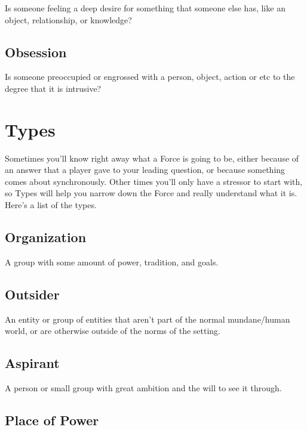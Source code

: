 \documentclass[10pt,twoside,openright]{memoir}
\begin{document}
Is someone feeling a deep desire for something that someone else has,
like an object, relationship, or knowledge?

\hypertarget{obsession}{%
\subsection{Obsession}\label{obsession}}

Is someone preoccupied or engrossed with a person, object, action or etc
to the degree that it is intrusive?

\hypertarget{types}{%
\section{Types}\label{types}}

Sometimes you'll know right away what a Force is going to be, either
because of an answer that a player gave to your leading question, or
because something comes about synchronously. Other times you'll only
have a stressor to start with, so Types will help you narrow down the
Force and really understand what it is. Here's a list of the types.

\hypertarget{organization}{%
\subsection{Organization}\label{organization}}

A group with some amount of power, tradition, and goals.

\hypertarget{outsider}{%
\subsection{Outsider}\label{outsider}}

An entity or group of entities that aren't part of the normal
mundane/human world, or are otherwise outside of the norms of the
setting.

\hypertarget{aspirant}{%
\subsection{Aspirant}\label{aspirant}}

A person or small group with great ambition and the will to see it
through.

\hypertarget{place-of-power-4}{%
\subsection{Place of Power}\label{place-of-power-4}}
\end{document}
